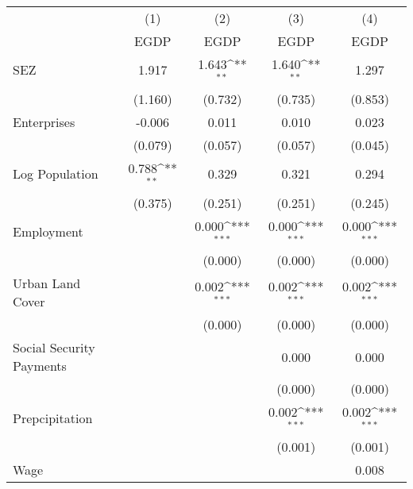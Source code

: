 {
\def\sym#1{\ifmmode^{#1}\else\(^{#1}\)\fi}
\begin{tabular}{l*{4}{c}}
\hline\hline
                    &\multicolumn{1}{c}{(1)}&\multicolumn{1}{c}{(2)}&\multicolumn{1}{c}{(3)}&\multicolumn{1}{c}{(4)}\\
                    &\multicolumn{1}{c}{EGDP}&\multicolumn{1}{c}{EGDP}&\multicolumn{1}{c}{EGDP}&\multicolumn{1}{c}{EGDP}\\
\hline
SEZ                 &       1.917         &       1.643\sym{**} &       1.640\sym{**} &       1.297         \\
                    &     (1.160)         &     (0.732)         &     (0.735)         &     (0.853)         \\
Enterprises         &      -0.006         &       0.011         &       0.010         &       0.023         \\
                    &     (0.079)         &     (0.057)         &     (0.057)         &     (0.045)         \\
Log Population      &       0.788\sym{**} &       0.329         &       0.321         &       0.294         \\
                    &     (0.375)         &     (0.251)         &     (0.251)         &     (0.245)         \\
Employment          &                     &       0.000\sym{***}&       0.000\sym{***}&       0.000\sym{***}\\
                    &                     &     (0.000)         &     (0.000)         &     (0.000)         \\
Urban Land Cover    &                     &       0.002\sym{***}&       0.002\sym{***}&       0.002\sym{***}\\
                    &                     &     (0.000)         &     (0.000)         &     (0.000)         \\
Social Security Payments&                     &                     &       0.000         &       0.000         \\
                    &                     &                     &     (0.000)         &     (0.000)         \\
Prepcipitation      &                     &                     &       0.002\sym{***}&       0.002\sym{***}\\
                    &                     &                     &     (0.001)         &     (0.001)         \\
Wage                &                     &                     &                     &       0.008         \\

\end{tabular}}
